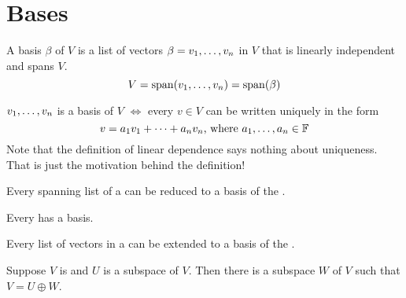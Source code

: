 \section{Bases}


\setcounter{thm}{25}
\begin{mydef} [Basis]
  A basis $\beta$ of $V$ is a list of vectors $\beta = v_1, \dots, v_n$ in $V$ that is linearly independent and spans $V$.
  \begin{equation}
    V = \operatorname{span} (v_1, \dots, v_n) = \operatorname{span} ( \beta )
  \end{equation}
\end{mydef}

\setcounter{thm}{27}
\begin{thm} 
  $v_1, \dots, v_n$ is a basis of $V$ $\iff$ every $v \in V$ can be written uniquely in the form
  \begin{equation}
    v=a_1 v_1 + \dots + a_n v_n $, where $ a_1, \dots, a_n \in \myF
  \end{equation}
  Note that the definition of linear dependence says nothing about uniqueness. That is just the motivation behind the definition!
\end{thm}

\setcounter{thm}{29}
\begin{thm}  
  Every spanning list of a \vs can be reduced to a basis of the \vs.
\end{thm}

\setcounter{thm}{30}
\begin{thm} 
  Every \findimvs has a basis.
\end{thm}

\begin{thm} 
  Every \lid list of vectors in a  \findimvs can be extended to a basis of the \vs. 
\end{thm}

\begin{thm} 
  Suppose $V$ is \fd and $U$ is a subspace of $V$. Then there is a subspace $W$ of $V$ such that $V=U \oplus W$. 
\end{thm}
